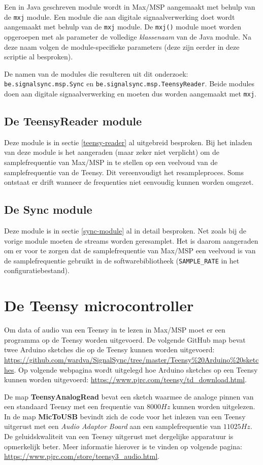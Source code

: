 Een in Java geschreven module wordt in Max/MSP aangemaakt met behulp van de \texttt{mxj} module. Een module die aan digitale signaalverwerking doet wordt aangemaakt met behulp van de \texttt{mxj\textapprox} module. De \texttt{mxj(\textapprox)} module moet worden opgeroepen met als parameter de volledige \emph{klassenaam} van de Java module. Na deze naam volgen de module-specifieke parameters (deze zijn eerder in deze scriptie al besproken).

De namen van de modules die resulteren uit dit onderzoek: \texttt{be.signalsync.msp.Sync} en \texttt{be.signalsync.msp.TeensyReader}. Beide modules doen aan digitale signaalverwerking en moeten dus worden aangemaakt met \texttt{mxj\textapprox}.


\subsection*{De TeensyReader module}
Deze module is in sectie \ref{teensy-reader} al uitgebreid besproken. Bij het inladen van deze module is het aangeraden (maar zeker niet verplicht) om de samplefrequentie van Max/MSP in te stellen op een veelvoud van de samplefrequentie van de Teensy. Dit vereenvoudigt het resampleproces. Soms ontstaat er drift wanneer de frequenties niet eenvoudig kunnen worden omgezet.

\subsection*{De Sync module}

Deze module is in sectie \ref{sync-module} al in detail besproken. Net zoals bij de vorige module moeten de streams worden geresamplet. Het is daarom aangeraden om er voor te zorgen dat de samplefrequentie van Max/MSP een veelvoud is van de samplefrequentie gebruikt in de softwarebibliotheek (\texttt{SAMPLE\_RATE} in het configuratiebestand).

\section*{De Teensy microcontroller}
\label{read-teensy}

Om data of audio van een Teensy in te lezen in Max/MSP moet er een programma op de Teensy worden uitgevoerd.
De volgende GitHub map bevat twee Arduino sketches die op de Teensy kunnen worden uitgevoerd: \url{https://github.com/wardva/SignalSync/tree/master/Teensy\%20Arduino\%20sketches}. Op volgende webpagina wordt uitgelegd hoe Arduino sketches op een Teensy kunnen worden uitgevoerd: \url{https://www.pjrc.com/teensy/td_download.html}. 

De map \textbf{TeensyAnalogRead} bevat een sketch waarmee de analoge pinnen van een standaard Teensy met een frequentie van $8000Hz$ kunnen worden uitgelezen. In de map \textbf{MicToUSB} bevindt zich de code voor het inlezen van een Teensy uitgerust met een \textit{Audio Adaptor Board} aan een samplefrequentie van $11025Hz$. De geluidskwaliteit van een Teensy uitgerust met dergelijke apparatuur is opmerkelijk beter. Meer informatie hierover is te vinden op volgende pagina: \url{https://www.pjrc.com/store/teensy3_audio.html}.
